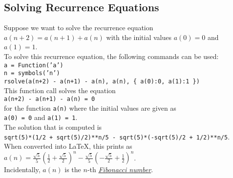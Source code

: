 \documentclass{article}
\begin{document}
\subsection{Solving Recurrence Equations}
Suppose we want to solve the recurrence equation
\\[0.2cm]
\hspace*{1.3cm}
$a(n+2) = a(n+1) + a(n)$  \quad with the initial values $a(0) = 0$ and $a(1) = 1$.
\\[0.2cm]
To solve this recurrence equation, the following commands can be used:
\\[0.2cm]
\hspace*{1.3cm}
\texttt{a = Function('a')}\\
\hspace*{1.3cm}
\texttt{n = symbols('n')} \\
\hspace*{1.3cm}
\texttt{rsolve(a(n+2) - a(n+1) - a(n), a(n), \{ a(0):0, a(1):1 \})}
\\[0.2cm]
This function call solves the equation
\\[0.2cm]
\hspace*{1.3cm}
\texttt{a(n+2) - a(n+1) - a(n) = 0} 
\\[0.2cm]
for the function \texttt{a(n)} where the initial values are given as
\\[0.2cm]
\hspace*{1.3cm}
 \texttt{a(0) = 0} \quad and \quad \texttt{a(1) = 1}. 
\\[0.2cm]
The solution that is computed is
\\[0.2cm]
\hspace*{1.3cm}
\texttt{sqrt(5)*(1/2 + sqrt(5)/2)**n/5 - sqrt(5)*(-sqrt(5)/2 + 1/2)**n/5}.
\\[0.2cm]
When converted into \LaTeX, this prints as
\\[0.2cm]
\hspace*{1.3cm}
$\displaystyle a(n) = \frac{\sqrt{5}}{5} \left(\frac{1}{2} + \frac{\sqrt{5}}{2}\right)^{n} - \frac{\sqrt{5}}{5} \left(- \frac{\sqrt{5}}{2} + \frac{1}{2}\right)^{n}$.
\\[0.2cm]
Incidentally, $a(n)$ is the $n$-th 
\href{http://en.wikipedia.org/wiki/Fibonacci_number}{\emph{Fibonacci number}}.
\end{document}
